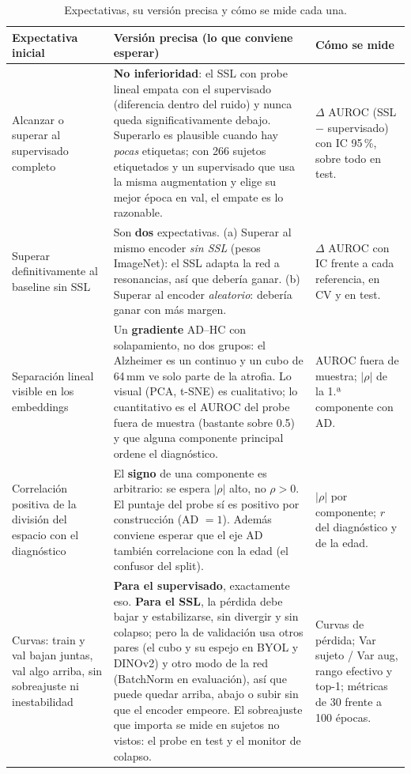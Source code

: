 \documentclass[11pt,a4paper]{article}
\begin{document}
\begin{table}[H]
\centering
\small
\begin{tabularx}{\textwidth}{>{\raggedright\arraybackslash}p{3.6cm}>{\raggedright\arraybackslash}X>{\raggedright\arraybackslash}p{3.9cm}}
\toprule
Expectativa inicial & Versión precisa (lo que conviene esperar) & Cómo se mide \\
\midrule
Alcanzar o superar al supervisado completo &
  \textbf{No inferioridad}: el SSL con probe lineal empata con el supervisado (diferencia dentro del
  ruido) y nunca queda significativamente debajo. Superarlo es plausible cuando hay \emph{pocas}
  etiquetas; con 266 sujetos etiquetados y un supervisado que usa la misma augmentation y elige su
  mejor época en val, el empate es lo razonable. &
  $\Delta$ AUROC (SSL $-$ supervisado) con IC 95\,\%, sobre todo en test. \\
\addlinespace
Superar definitivamente al baseline sin SSL &
  Son \textbf{dos} expectativas. (a) Superar al mismo encoder \emph{sin SSL} (pesos ImageNet): el SSL
  adapta la red a resonancias, así que debería ganar. (b) Superar al encoder \emph{aleatorio}:
  debería ganar con más margen. &
  $\Delta$ AUROC con IC frente a cada referencia, en CV y en test. \\
\addlinespace
Separación lineal visible en los embeddings &
  Un \textbf{gradiente} AD--HC con solapamiento, no dos grupos: el Alzheimer es un continuo y un cubo
  de 64\,mm ve solo parte de la atrofia. Lo visual (PCA, t-SNE) es cualitativo; lo cuantitativo es el
  AUROC del probe fuera de muestra (bastante sobre 0.5) y que alguna componente principal ordene el
  diagnóstico. &
  AUROC fuera de muestra; $|\rho|$ de la 1.ª componente con AD. \\
\addlinespace
Correlación positiva de la división del espacio con el diagnóstico &
  El \textbf{signo} de una componente es arbitrario: se espera $|\rho|$ alto, no $\rho>0$. El puntaje
  del probe sí es positivo por construcción (AD $=1$). Además conviene esperar que el eje AD también
  correlacione con la edad (el confusor del split). &
  $|\rho|$ por componente; $r$ del diagnóstico y de la edad. \\
\addlinespace
Curvas: train y val bajan juntas, val algo arriba, sin sobreajuste ni inestabilidad &
  \textbf{Para el supervisado}, exactamente eso. \textbf{Para el SSL}, la pérdida debe bajar y
  estabilizarse, sin divergir y sin colapso; pero la de validación usa otros pares (el cubo y su
  espejo en BYOL y DINOv2) y otro modo de la red (BatchNorm en evaluación), así que puede quedar
  arriba, abajo o subir sin que el encoder empeore. El sobreajuste que importa se mide en sujetos no
  vistos: el probe en test y el monitor de colapso. &
  Curvas de pérdida; Var sujeto / Var aug, rango efectivo y top-1; métricas de 30 frente a 100
  épocas. \\
\bottomrule
\end{tabularx}
\caption{Expectativas, su versión precisa y cómo se mide cada una.}
\label{tab:expected}
\end{table}
\end{document}
